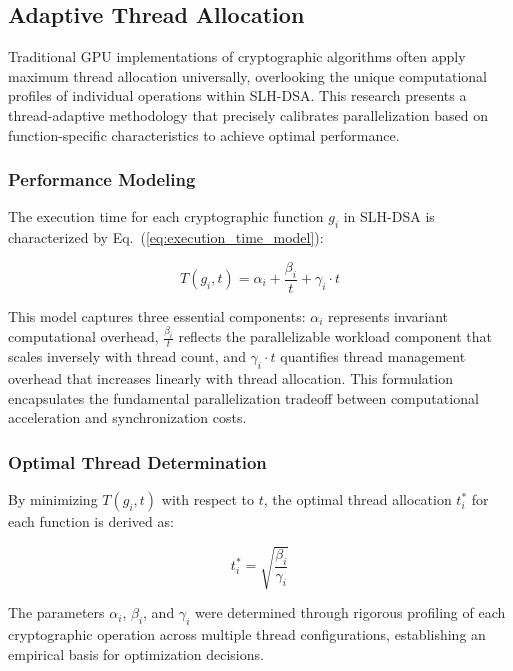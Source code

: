 \documentclass[journal]{IEEEtran}
\begin{document}
\subsection{Adaptive Thread Allocation}

Traditional GPU implementations of cryptographic algorithms often apply maximum thread allocation universally, overlooking the unique computational profiles of individual operations within SLH-DSA. This research presents a thread-adaptive methodology that precisely calibrates parallelization based on function-specific characteristics to achieve optimal performance.

\subsubsection{Performance Modeling}

The execution time for each cryptographic function $g_i$ in SLH-DSA is characterized by Eq.~(\ref{eq:execution_time_model}):

\begin{equation}
  \label{eq:execution_time_model}
  T(g_i, t) = \alpha_i + \frac{\beta_i}{t} + \gamma_i \cdot t
\end{equation}

This model captures three essential components: $\alpha_i$ represents invariant computational overhead, $\frac{\beta_i}{t}$ reflects the parallelizable workload component that scales inversely with thread count, and $\gamma_i \cdot t$ quantifies thread management overhead that increases linearly with thread allocation. This formulation encapsulates the fundamental parallelization tradeoff between computational acceleration and synchronization costs.

\subsubsection{Optimal Thread Determination}

By minimizing $T(g_i, t)$ with respect to $t$, the optimal thread allocation $t_i^*$ for each function is derived as:

\begin{equation}
  \label{eq:optimal_thread_count}
  t_i^* = \sqrt{\frac{\beta_i}{\gamma_i}}
\end{equation}

The parameters $\alpha_i$, $\beta_i$, and $\gamma_i$ were determined through rigorous profiling of each cryptographic operation across multiple thread configurations, establishing an empirical basis for optimization decisions.
\end{document}

